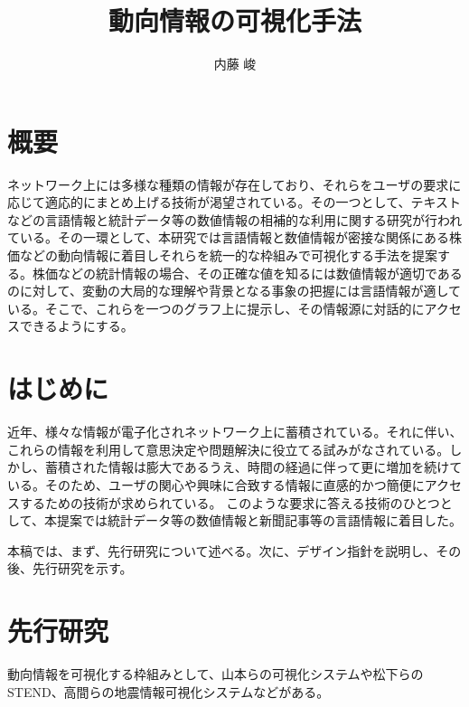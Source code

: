 \documentclass{matsushita-zemi}
\title{動向情報の可視化手法}
\author{内藤 峻}
\begin{document}
\maketitle

\section*{概要}
\label{abstract}
ネットワーク上には多様な種類の情報が存在しており、それらをユーザの要求に応じて適応的にまとめ上げる技術が渇望されている。その一つとして、テキストなどの言語情報と統計データ等の数値情報の相補的な利用に関する研究が行われている。その一環として、本研究では言語情報と数値情報が密接な関係にある株価などの動向情報に着目しそれらを統一的な枠組みで可視化する手法を提案する。株価などの統計情報の場合、その正確な値を知るには数値情報が適切であるのに対して、変動の大局的な理解や背景となる事象の把握には言語情報が適している。そこで、これらを一つのグラフ上に提示し、その情報源に対話的にアクセスできるようにする。\cite{Elucignage}

\section{はじめに}
\label{background}
近年、様々な情報が電子化されネットワーク上に蓄積されている。それに伴い、これらの情報を利用して意思決定や問題解決に役立てる試みがなされている。しかし、蓄積された情報は膨大であるうえ、時間の経過に伴って更に増加を続けている。そのため、ユーザの関心や興味に合致する情報に直感的かつ簡便にアクセスするための技術が求められている\cite{information_compilation}\cite{Elucignage-jsai}。
このような要求に答える技術のひとつとして、本提案では統計データ等の数値情報と新聞記事等の言語情報に着目した。

本稿では、まず、先行研究について述べる。次に、デザイン指針を説明し、その後、先行研究を示す。

\section{先行研究}
\label{relatedworks} 
動向情報を可視化する枠組みとして、山本らの可視化システム\cite{Tagged_corpus}や松下らのSTEND\cite{STEND}、高間らの地震情報可視化システム\cite{SpaceTrendInformation}などがある。
\end{document}
